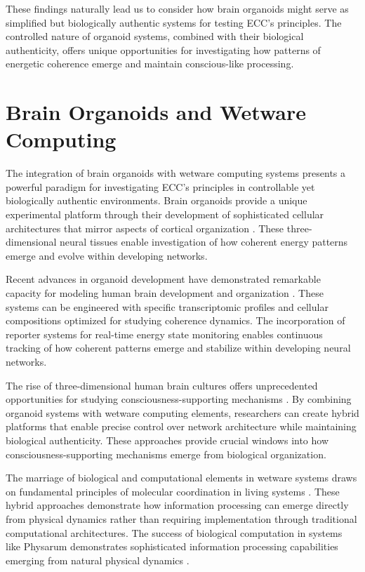 \begin{refsection}
These findings naturally lead us to consider how brain organoids might serve as simplified but biologically authentic systems for testing ECC's principles. The controlled nature of organoid systems, combined with their biological authenticity, offers unique opportunities for investigating how patterns of energetic coherence emerge and maintain conscious-like processing.

\section{Brain Organoids and Wetware Computing}

The integration of brain organoids with wetware computing systems presents a powerful paradigm for investigating ECC's principles in controllable yet biologically authentic environments. Brain organoids provide a unique experimental platform through their development of sophisticated cellular architectures that mirror aspects of cortical organization \cite{Lancaster2013}. These three-dimensional neural tissues enable investigation of how coherent energy patterns emerge and evolve within developing networks.

Recent advances in organoid development have demonstrated remarkable capacity for modeling human brain development and organization \cite{Quadrato2017}. These systems can be engineered with specific transcriptomic profiles and cellular compositions optimized for studying coherence dynamics. The incorporation of reporter systems for real-time energy state monitoring enables continuous tracking of how coherent patterns emerge and stabilize within developing neural networks.

The rise of three-dimensional human brain cultures offers unprecedented opportunities for studying consciousness-supporting mechanisms \cite{Pasca2018}. By combining organoid systems with wetware computing elements, researchers can create hybrid platforms that enable precise control over network architecture while maintaining biological authenticity. These approaches provide crucial windows into how consciousness-supporting mechanisms emerge from biological organization.

The marriage of biological and computational elements in wetware systems draws on fundamental principles of molecular coordination in living systems \cite{MacLennan2009}. These hybrid approaches demonstrate how information processing can emerge directly from physical dynamics rather than requiring implementation through traditional computational architectures. The success of biological computation in systems like Physarum demonstrates sophisticated information processing capabilities emerging from natural physical dynamics \cite{Adamatzky2016}.


\end{refsection}
